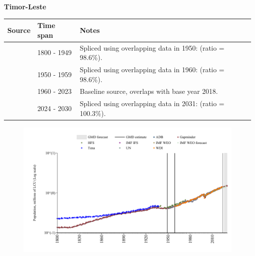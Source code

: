 \documentclass[12pt,a4paper,landscape]{article}
\begin{document}
\begin{adjustbox}{max totalsize={\paperwidth}{\paperheight},center}
\begin{minipage}[t][\textheight][t]{\textwidth}
\vspace*{0.5cm}
{}
\begin{center}
{\Large\bfseries Timor-Leste}
\end{center}
\vspace{0.5cm}
\begin{table}[H]
\centering
\small
\begin{tabular}{|l|l|l|}
\hline
\textbf{Source} & \textbf{Time span} & \textbf{Notes} \\
\hline
\rowcolor{white}\cite{Gapminder}& 1800 - 1949 &Spliced using overlapping data in 1950: (ratio = 98.6\%).\\
\rowcolor{lightgray}\cite{IMF_IFS}& 1950 - 1959 &Spliced using overlapping data in 1960: (ratio = 98.6\%).\\
\rowcolor{white}\cite{WDI}& 1960 - 2023 &Baseline source, overlaps with base year 2018.\\
\rowcolor{lightgray}\cite{Gapminder}& 2024 - 2030 &Spliced using overlapping data in 2031: (ratio = 100.3\%).\\
\hline
\end{tabular}
\end{table}
\begin{figure}[H]
\centering
\includegraphics[width=\textwidth,height=0.6\textheight,keepaspectratio]{graphs/TLS_pop.pdf}
\end{figure}
\end{minipage}
\end{adjustbox}
\end{document}
